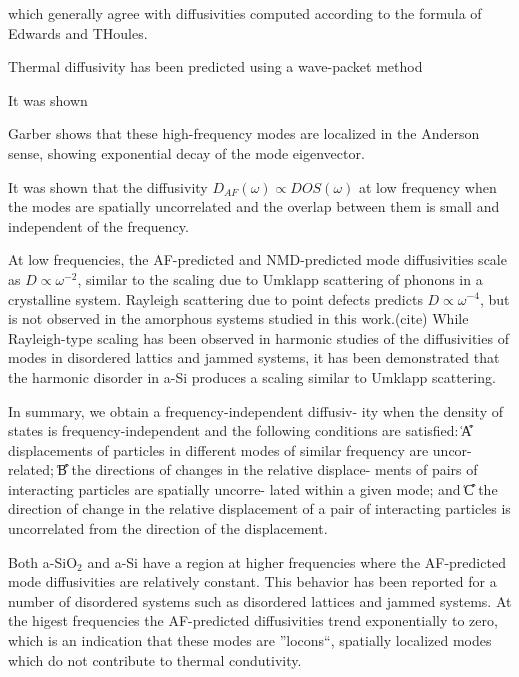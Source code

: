 \documentclass[aps,prb,twocolumn,superscriptaddress,footinbib,amsmath,amssymb,floatfix]{revtex4}
\begin{document}
which generally agree with diffusivities computed according to the 
formula of Edwards and THoules.\cite{edwards_numerical_1972,
feldman_numerical_1999,beltukov_ioffe-regel_2013}

Thermal diffusivity has been predicted using a wave-packet method

It was shown 

Garber shows that these high-frequency modes are localized in the 
Anderson sense, showing exponential decay of the mode eigenvector.
\cite{garber_numerical_2001}

It was shown that the diffusivity $D_{AF}(\omega) \propto DOS(\omega)$ 
at low frequency when the modes are spatially uncorrelated and the 
overlap between them is small and independent of the frequency.
\cite{vitelli_heat_2010,xu_energy_2009}

At low frequencies, the AF-predicted and NMD-predicted mode 
diffusivities scale as $D \propto \omega^{-2}$, similar to the scaling 
due to Umklapp scattering of phonons in a crystalline system. Rayleigh 
scattering due to point defects predicts $D \propto \omega^{-4}$, 
but is not observed in the amorphous systems studied in this work.(cite) 
While Rayleigh-type scaling has been 
observed in harmonic studies of the diffusivities of modes in 
disordered lattics and jammed systems,
\cite{sheng_heat_1991,xu_energy_2009,vitelli_heat_2010} 
it has been demonstrated that the harmonic disorder in a-Si 
produces a scaling similar to Umklapp scattering.
\cite{feldman_thermal_1993}

In summary, we obtain a frequency-independent diffusiv-
ity when the density of states is frequency-independent and
the following conditions are satisfied: ͑A͒ displacements of
particles in different modes of similar frequency are uncor-
related; ͑B͒ the directions of changes in the relative displace-
ments of pairs of interacting particles are spatially uncorre-
lated within a given mode; and ͑C͒ the direction of change in
the relative displacement of a pair of interacting particles is
uncorrelated from the direction of the displacement.

Both a-SiO$_2$ and a-Si have a region at higher frequencies where the 
AF-predicted mode diffusivities are relatively constant. This behavior 
has been reported for a number of disordered systems such as 
disordered lattices
\cite{sheng_heat_1991,beltukov_ioffe-regel_2013,larkin_predicting_2013} 
and jammed systems. At the higest frequencies the AF-predicted 
diffusivities trend exponentially to zero, which is an indication 
that these modes are ''locons``, spatially localized modes which 
do not contribute to thermal condutivity.\cite{allen_diffusons_1999} 
\end{document}
